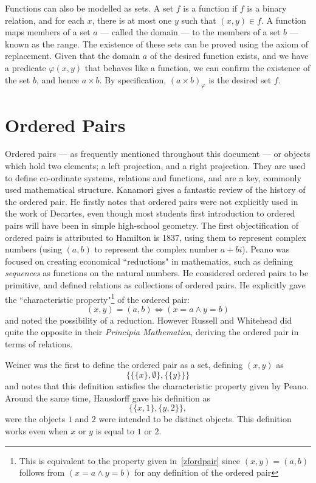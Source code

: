 \documentclass[11pt]{report}
\theoremstyle{definition}
\theoremstyle{theorem}
\theoremstyle{lemma}
\begin{document}
Functions can also be modelled as sets.
A set $f$ is a function if $f$ is a binary relation, and for each $x$, there is at most one $y$ such that $(x,y)\in f$.
A function maps members of a set $a$ --- called the domain --- to the members of a set $b$ --- known as the range.
The existence of these sets can be proved using the axiom of replacement.
Given that the domain $a$ of the desired function exists, and we have a predicate $\varphi(x,y)$ that behaves like a function, we can confirm the existence of the set $b$, and hence $a\times b$.
By specification, $(a\times b)_\varphi$ is the desired set $f$.

\section{Ordered Pairs}
Ordered pairs ---  as frequently mentioned throughout this document --- or objects which hold two elements; a left projection, and a right projection. 
They are used to define co-ordinate systems, relations and functions, and are a key, commonly used mathematical structure. 
Kanamori \cite{kanamori} gives a fantastic review of the history of the ordered pair. 
He firstly notes that ordered pairs were not explicitly used in the work of Decartes, even though most students first introduction to ordered pairs will have been in simple high-school geometry.
The first objectification of ordered pairs is attributed to Hamilton is 1837, using them to represent complex numbers (using $(a,b)$ to represent the complex number $a+bi$).
Peano was focused on creating economical ``reductions" in mathematics, such as defining \emph{sequences} as functions on the natural numbers. 
He considered ordered pairs to be primitive, and defined relations as collections of ordered pairs. 
He explicitly gave the ``characteristic property"\footnote{This is equivalent to the property given in~\ref{zfordpair} since $(x,y)=(a,b)$ follows from $(x=a\wedge y=b)$ for any definition of the ordered pair}  of the ordered pair:
$$(x,y) = (a,b) \iff (x=a \wedge y=b)$$
and noted the possibility of a reduction.   
However Russell and Whitehead did quite the opposite in their \emph{Principia Mathematica}, deriving the ordered pair in terms of relations. 

Weiner was the first to define the ordered pair as a set, defining $(x,y)$ as
$$\{\{\{x\},\emptyset\},\{\{y\}\}\}$$ 
and notes that this definition satisfies the characteristic property given by Peano.
Around the same time, Hausdorff\cite{hausdorff} gave his definition as 
$$\{\{x,1\},\{y,2\}\},$$ 
were the objects $1$ and $2$ were intended to be distinct objects.
This definition works even when $x$ or $y$ is equal to $1$ or $2$. 
\end{document}
